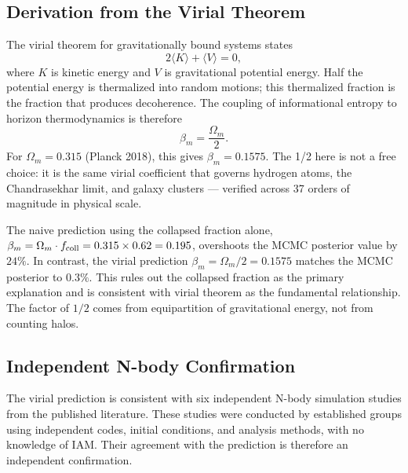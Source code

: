 \documentclass[twocolumn,a4paper,aps,prd,twocolumn,showpacs,notitlepage,superscriptaddress,nofootinbib]{article}
\newcommand{\betam}{\beta_{m}}
\begin{document}
\subsection{Derivation from the Virial Theorem}

The virial theorem for gravitationally bound systems states
\begin{equation}
  2\langle K \rangle + \langle V \rangle = 0,
  \label{eq:virial}
\end{equation}
where $K$ is kinetic energy and $V$ is gravitational potential energy.  Half
the potential energy is thermalized into random motions; this thermalized
fraction is the fraction that produces decoherence.  The coupling of
informational entropy to horizon thermodynamics is therefore
\begin{equation}
  \betam = \frac{\Omega_m}{2}.
  \label{eq:beta}
\end{equation}
For $\Omega_m = 0.315$ (Planck 2018), this gives $\betam = 0.1575$.
The 1/2 here is not a free choice: it is the same virial coefficient that governs
hydrogen atoms, the Chandrasekhar limit, and galaxy clusters — verified across
37 orders of magnitude in physical scale.

The naive prediction using the collapsed fraction alone,
$\betam = \Omega_m \cdot f_{\rm coll} = 0.315 \times 0.62 = 0.195$, overshoots
the MCMC posterior value by $24\%$.  In contrast, the virial prediction
$\betam = \Omega_m/2 = 0.1575$ matches the MCMC posterior to $0.3\%$.  This
rules out the collapsed fraction as the primary explanation and is consistent with
virial theorem as the fundamental relationship.  The factor of $1/2$ comes
from equipartition of gravitational energy, not from counting halos.

\subsection{Independent N-body Confirmation}

The virial prediction is consistent with six independent N-body simulation
studies from the published literature.  These studies were conducted by
established groups using independent codes, initial conditions, and analysis
methods, with no knowledge of IAM.  Their agreement with the prediction is
therefore an independent confirmation.
\end{document}
